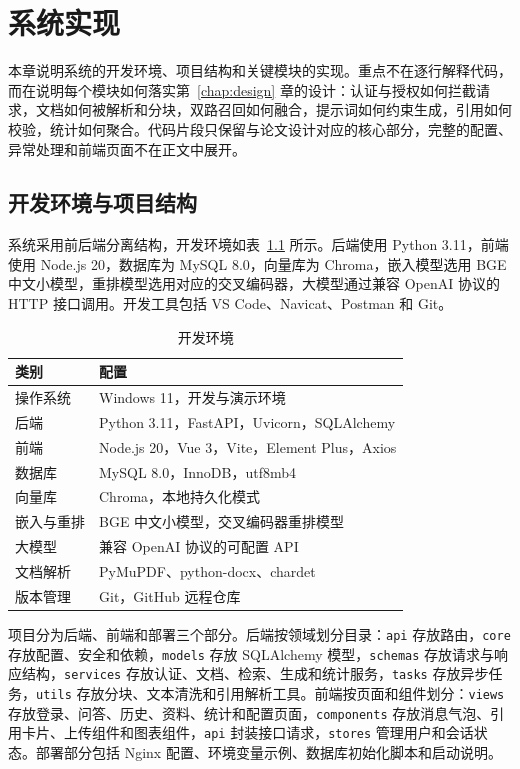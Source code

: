 \chapter{系统实现}
\label{chap:implementation}

本章说明系统的开发环境、项目结构和关键模块的实现。重点不在逐行解释代码，而在说明每个模块如何落实第~\ref{chap:design} 章的设计：认证与授权如何拦截请求，文档如何被解析和分块，双路召回如何融合，提示词如何约束生成，引用如何校验，统计如何聚合。代码片段只保留与论文设计对应的核心部分，完整的配置、异常处理和前端页面不在正文中展开。

\section{开发环境与项目结构}
\label{sec:environment}

系统采用前后端分离结构，开发环境如表~\ref{tab:env} 所示。后端使用 Python 3.11，前端使用 Node.js 20，数据库为 MySQL 8.0，向量库为 Chroma，嵌入模型选用 BGE 中文小模型，重排模型选用对应的交叉编码器，大模型通过兼容 OpenAI 协议的 HTTP 接口调用。开发工具包括 VS Code、Navicat、Postman 和 Git。

\begin{table}[H]
  \centering
  \caption{开发环境}
  \label{tab:env}
  \renewcommand{\arraystretch}{1.25}
  \begin{tabular}{p{3.0cm}p{9.6cm}}
    \toprule
    类别 & 配置 \\
    \midrule
    操作系统 & Windows 11，开发与演示环境 \\
    后端 & Python 3.11，FastAPI，Uvicorn，SQLAlchemy \\
    前端 & Node.js 20，Vue 3，Vite，Element Plus，Axios \\
    数据库 & MySQL 8.0，InnoDB，utf8mb4 \\
    向量库 & Chroma，本地持久化模式 \\
    嵌入与重排 & BGE 中文小模型，交叉编码器重排模型 \\
    大模型 & 兼容 OpenAI 协议的可配置 API \\
    文档解析 & PyMuPDF、python-docx、chardet \\
    版本管理 & Git，GitHub 远程仓库 \\
    \bottomrule
  \end{tabular}
\end{table}

项目分为后端、前端和部署三个部分。后端按领域划分目录：\texttt{api} 存放路由，\texttt{core} 存放配置、安全和依赖，\texttt{models} 存放 SQLAlchemy 模型，\texttt{schemas} 存放请求与响应结构，\texttt{services} 存放认证、文档、检索、生成和统计服务，\texttt{tasks} 存放异步任务，\texttt{utils} 存放分块、文本清洗和引用解析工具。前端按页面和组件划分：\texttt{views} 存放登录、问答、历史、资料、统计和配置页面，\texttt{components} 存放消息气泡、引用卡片、上传组件和图表组件，\texttt{api} 封装接口请求，\texttt{stores} 管理用户和会话状态。部署部分包括 Nginx 配置、环境变量示例、数据库初始化脚本和启动说明。

